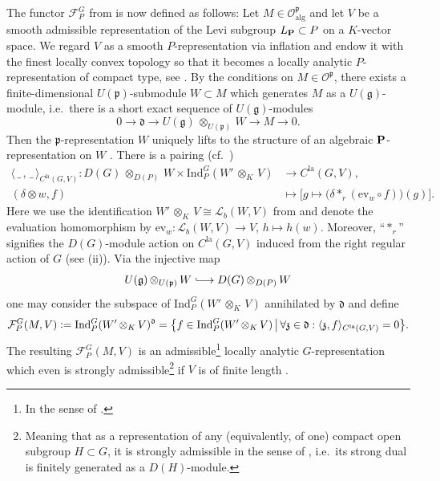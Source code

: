 \documentclass[a4paper, reqno, 10pt]{amsart}
\theoremstyle{definition}
\numberwithin{equation}{section}
\newcommand{\blank}{{\,\_\,}}
\newcommand{\botimes}[1]{{\,\otimes_{#1}\,}}
\newcommand{\defeq}{\vcentcolon=}
\newcommand{\ev}{{\mathrm{ev}}}
\newcommand{\Ind}{{\mathrm{Ind}}}
\newcommand{\la}{{\mathrm{la}}}
\newcommand{\lra}{\longrightarrow}
\newcommand{\lto}{\longmapsto}
\newcommand{\mto}{\mapsto}
\newcommand{\ra}{\rightarrow}
\newcommand{\CF}{{\mathcal {F}}}
\newcommand{\CL}{{\mathcal {L}}}
\newcommand{\CO}{{\mathcal {O}}}
\newcommand{\bP}{{\mathrm{\bf P}}}
\newcommand{\Fd}{{\mathfrak {d}}}
\newcommand{\Fg}{{\mathfrak {g}}}
\newcommand{\Fp}{{\mathfrak {p}}}
\newcommand{\Fz}{{\mathfrak {z}}}
\DeclareRobustCommand\longhookrightarrow
{\lhook\joinrel\longrightarrow}
\newcommand{\alg}{{\mathrm{alg}}}
\begin{document}
The functor $\CF_P^G$ from \cite[\S 3,4]{OrlikStrauch15JordanHoelderSerLocAnRep} is now defined as follows:
Let $M \in \CO^\Fp_\alg$ and let $V$ be a smooth admissible representation of the Levi subgroup $L_\bP \subset P$ on a $K$-vector space.
We regard $V$ as a smooth $P$-representation via inflation and endow it with the finest locally convex topology so that it becomes a locally analytic $P$-representation of compact type, see \cite[\S 2]{SchneiderTeitelbaumPrasad01UgFinLocAnRep}.
By the conditions on $M \in \CO^\Fp$, there exists a finite-dimensional $U(\Fp)$-submodule $W\subset M$ which generates $M$ as a $U(\Fg)$-module, i.e.\ there is a short exact sequence of $U(\Fg)$-modules
\begin{equation*}
	0 \lra \Fd \lra U(\Fg) \botimes{U(\Fp)} W \lra M \lra 0  .
\end{equation*}
Then the $\Fp$-representation $W$ uniquely lifts to the structure of an algebraic $\bP$-representation on $W$ \cite[Lemma 3.2]{OrlikStrauch15JordanHoelderSerLocAnRep}.
There is a pairing (cf.\ \cite[(3.2.2)]{OrlikStrauch15JordanHoelderSerLocAnRep})
\begin{align*}
	\langle \blank , \!\blank \rangle_{C^\la(G,V)} \colon D(G) \botimes{D(P)} W  \times \Ind^G_P ( W'\botimes{K} V ) &\lra C^\la(G,V) , \\
	(\delta \otimes w , f) &\lto \big[ g \mto \big( \delta \ast_r (\ev_w \circ f) \big) (g) \big]	.
\end{align*}
Here we use the identification $W' \botimes{K} V \cong \CL_b (W,V)$ from \cite[Cor.\ 18.8]{Schneider02NonArchFunctAna} and denote the evaluation homomorphism by $\ev_w \colon \CL_b(W,V) \ra V$, $h \mto h(w)$.
Moreover, ``$\ast_r$'' signifies the $D(G)$-module action on $C^\la(G,V)$ induced from the right regular action of $G$ (see  (ii)).
Via the injective map
\begin{equation*}
	U(\Fg) \botimes{U(\Fp)} W \longhookrightarrow D(G) \botimes{D(P)} W
\end{equation*}
one may consider the subspace of $\Ind^G_P ( W'\botimes{K} V)$ annihilated by $\Fd$ and define \cite[(4.4.1)]{OrlikStrauch15JordanHoelderSerLocAnRep}
\begin{equation*}
	\CF^G_P (M, V) \defeq \Ind^G_P (W'\botimes{K} V)^\Fd = \big\{ f\in \Ind^G_P ( W'\botimes{K} V) \,\big\vert\, \forall \Fz \in \Fd : \langle \Fz, f \rangle_{C^\la(G,V)} = 0 \big\} .
\end{equation*}
The resulting $\CF^G_P(M,V)$ is an admissible\footnote{In the sense of \cite[\S 6]{SchneiderTeitelbaum03AlgpAdicDistAdmRep}.} locally analytic $G$-representation which even is strongly admissible\footnote{Meaning that as a representation of any (equivalently, of one) compact open subgroup $H \subset G$, it is strongly admissible in the sense of \cite[\S 3]{SchneiderTeitelbaum02LocAnDistApplToGL2}, i.e.\ its strong dual is finitely generated as a $D(H)$-module.} if $V$ is of finite length \cite[Prop.\  4.8]{OrlikStrauch15JordanHoelderSerLocAnRep}.
\end{document}

